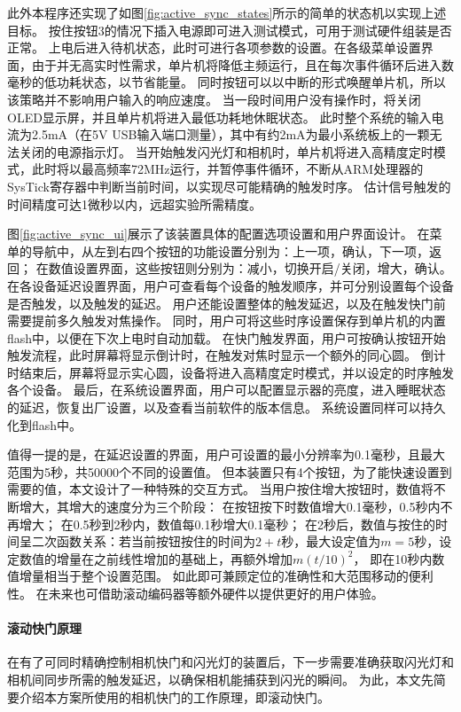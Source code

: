 此外本程序还实现了如图\ref{fig:active_sync_states}所示的简单的状态机以实现上述目标。
按住按钮3的情况下插入电源即可进入测试模式，可用于测试硬件组装是否正常。
上电后进入待机状态，此时可进行各项参数的设置。在各级菜单设置界面，由于并无高实时性需求，单片机将降低主频运行，且在每次事件循环后进入数毫秒的低功耗状态，以节省能量。
同时按钮可以以中断的形式唤醒单片机，所以该策略并不影响用户输入的响应速度。
当一段时间用户没有操作时，将关闭OLED显示屏，并且单片机将进入最低功耗地休眠状态。
此时整个系统的输入电流为2.5mA（在5V USB输入端口测量），其中有约2mA为最小系统板上的一颗无法关闭的电源指示灯。
当开始触发闪光灯和相机时，单片机将进入高精度定时模式，此时将以最高频率72MHz运行，并暂停事件循环，不断从ARM处理器的SysTick寄存器中判断当前时间，以实现尽可能精确的触发时序。
估计信号触发的时间精度可达1微秒以内，远超实验所需精度。

图\ref{fig:active_sync_ui}展示了该装置具体的配置选项设置和用户界面设计。
在菜单的导航中，从左到右四个按钮的功能设置分别为：上一项，确认，下一项，返回；
在数值设置界面，这些按钮则分别为：减小，切换开启/关闭，增大，确认。
在各设备延迟设置界面，用户可查看每个设备的触发顺序，并可分别设置每个设备是否触发，以及触发的延迟。
用户还能设置整体的触发延迟，以及在触发快门前需要提前多久触发对焦操作。
同时，用户可将这些时序设置保存到单片机的内置flash中，以便在下次上电时自动加载。
在快门触发界面，用户可按确认按钮开始触发流程，此时屏幕将显示倒计时，在触发对焦时显示一个额外的同心圆。
倒计时结束后，屏幕将显示实心圆，设备将进入高精度定时模式，并以设定的时序触发各个设备。
最后，在系统设置界面，用户可以配置显示器的亮度，进入睡眠状态的延迟，恢复出厂设置，以及查看当前软件的版本信息。
系统设置同样可以持久化到flash中。

值得一提的是，在延迟设置的界面，用户可设置的最小分辨率为0.1毫秒，且最大范围为5秒，共50000个不同的设置值。
但本装置只有4个按钮，为了能快速设置到需要的值，本文设计了一种特殊的交互方式。
当用户按住增大按钮时，数值将不断增大，其增大的速度分为三个阶段：
在按钮按下时数值增大0.1毫秒，0.5秒内不再增大；
在0.5秒到2秒内，数值每0.1秒增大0.1毫秒；
在2秒后，数值与按住的时间呈二次函数关系：若当前按钮按住的时间为$2+t$秒，最大设定值为$m=5$秒，设定数值的增量在之前线性增加的基础上，再额外增加$m(t/10)^2$，
即在10秒内数值增量相当于整个设置范围。
如此即可兼顾定位的准确性和大范围移动的便利性。
在未来也可借助滚动编码器等额外硬件以提供更好的用户体验。

\paragraph{滚动快门原理}
在有了可同时精确控制相机快门和闪光灯的装置后，下一步需要准确获取闪光灯和相机间同步所需的触发延迟，以确保相机能捕获到闪光的瞬间。
为此，本文先简要介绍本方案所使用的相机快门的工作原理，即滚动快门。

